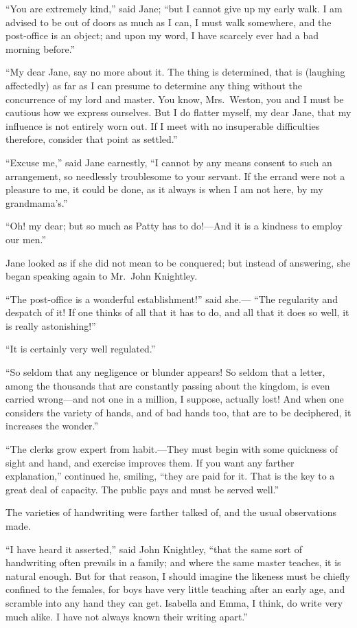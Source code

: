 ``You are extremely kind,'' said Jane; ``but I cannot give up my
early walk.  I am advised to be out of doors as much as I can,
I must walk somewhere, and the post-office is an object; and upon
my word, I have scarcely ever had a bad morning before.''

``My dear Jane, say no more about it.  The thing is determined,
that is (laughing affectedly) as far as I can presume to determine
any thing without the concurrence of my lord and master.  You know,
Mrs.\ Weston, you and I must be cautious how we express ourselves.
But I do flatter myself, my dear Jane, that my influence is not entirely
worn out.  If I meet with no insuperable difficulties therefore,
consider that point as settled.''

``Excuse me,'' said Jane earnestly, ``I cannot by any means consent
to such an arrangement, so needlessly troublesome to your servant.
If the errand were not a pleasure to me, it could be done, as it
always is when I am not here, by my grandmama's.''

``Oh! my dear; but so much as Patty has to do!---And it is a kindness
to employ our men.''

Jane looked as if she did not mean to be conquered; but instead
of answering, she began speaking again to Mr.\ John Knightley.

``The post-office is a wonderful establishment!'' said she.---%
``The regularity and despatch of it!  If one thinks of all that it
has to do, and all that it does so well, it is really astonishing!''

``It is certainly very well regulated.''

``So seldom that any negligence or blunder appears!  So seldom
that a letter, among the thousands that are constantly passing
about the kingdom, is even carried wrong---and not one in a million,
I suppose, actually lost!  And when one considers the variety
of hands, and of bad hands too, that are to be deciphered,
it increases the wonder.''

``The clerks grow expert from habit.---They must begin with some
quickness of sight and hand, and exercise improves them.  If you
want any farther explanation,'' continued he, smiling, ``they are
paid for it.  That is the key to a great deal of capacity.
The public pays and must be served well.''

The varieties of handwriting were farther talked of, and the usual
observations made.

``I have heard it asserted,'' said John Knightley, ``that the same
sort of handwriting often prevails in a family; and where the
same master teaches, it is natural enough.  But for that reason,
I should imagine the likeness must be chiefly confined to the females,
for boys have very little teaching after an early age, and scramble
into any hand they can get.  Isabella and Emma, I think, do write
very much alike.  I have not always known their writing apart.''


